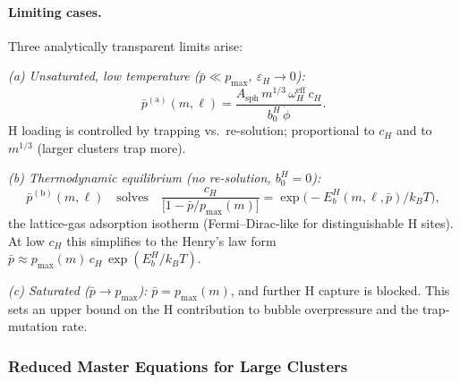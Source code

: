 \documentclass[pdflatex,sn-basic]{sn-jnl} %
\begin{document}
\paragraph{Limiting cases.}
Three analytically transparent limits arise:

\textit{(a) Unsaturated, low temperature ($\bar{p} \ll p_{\max}$,
$\varepsilon_H \to 0$):}
\begin{equation}\label{eq:pbar_lowT}
    \bar{p}^{\mathrm{(a)}}(m,\ell)
    = \frac{A_{\mathrm{sph}}\,m^{1/3}\,\omega_H^{\mathrm{eff}}\,c_H}
           {b_0^H\,\dot{\phi}}.
\end{equation}
H loading is controlled by trapping vs.\ re-solution; proportional to
$c_H$ and to $m^{1/3}$ (larger clusters trap more).

\textit{(b) Thermodynamic equilibrium (no re-solution,
$b_0^H = 0$):}
\begin{equation}\label{eq:pbar_thermo}
    \bar{p}^{\mathrm{(b)}}(m,\ell)
    \quad\text{solves}\quad
    \frac{c_H}{\bigl[1 - \bar{p}/p_{\max}(m)\bigr]}
    = \exp\!\bigl(-E_b^H(m,\ell,\bar{p})/k_BT\bigr),
\end{equation}
the lattice-gas adsorption isotherm (Fermi--Dirac-like for
distinguishable H sites).  At low $c_H$ this simplifies to the Henry's
law form $\bar{p} \approx p_{\max}(m)\,c_H\,\exp(E_b^H/k_BT)$.

\textit{(c) Saturated ($\bar{p} \to p_{\max}$):}
$\bar{p} = p_{\max}(m)$, and further H capture is blocked.
This sets an upper bound on the H contribution to bubble
overpressure and the trap-mutation rate.

\subsubsection{Reduced Master Equations for Large Clusters}
\label{sec:ME_large_H}
\end{document}
